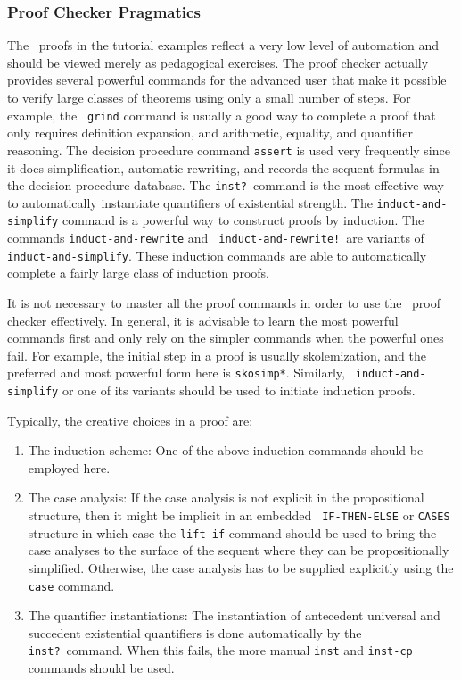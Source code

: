 \subsubsection{Proof Checker Pragmatics}

The \pvs\ proofs in the tutorial examples reflect a very low level of
automation and should be viewed merely as pedagogical exercises.  The
proof checker actually provides several powerful commands for the
advanced user that make it possible to verify large classes of
theorems using only a small number of steps.  For example, the {\tt
grind} command is usually a good way to complete a proof that only
requires definition expansion, and arithmetic, equality, and
quantifier reasoning.  The decision procedure command {\tt assert} is
used very frequently since it does simplification, automatic
rewriting, and records the sequent formulas in the decision procedure
database.  The {\tt inst?}\ command is the most effective way to
automatically instantiate quantifiers of existential strength.  The
{\tt induct-and-simplify} command is a powerful way to construct
proofs by induction.  The commands {\tt induct-and-rewrite} and {\tt
induct-and-rewrite!}\ are variants of {\tt induct-and-simplify}\@.
These induction commands are able to automatically complete a fairly
large class of induction proofs.

It is not necessary to master all the proof commands in order to use
the \pvs\ proof checker effectively.  In general, it is advisable to
learn the most powerful commands first and only rely on the simpler
commands when the powerful ones fail.  For example, the initial step
in a proof is usually skolemization, and the preferred and most
powerful form here is {\tt skosimp*}. Similarly, {\tt
induct-and-simplify} or one of its variants should be used to initiate
induction proofs.

 Typically, the creative choices in a proof are:
 \begin{enumerate}
 \item The induction scheme: One of the above induction commands should be
 employed here.

 \item The case analysis: If the case analysis is not explicit in the
 propositional structure, then it might be implicit in an embedded {\tt
 IF-THEN-ELSE} or {\tt CASES} structure in which case the {\tt lift-if}
 command should be used to bring the case analyses to the surface of the
 sequent where they can be propositionally simplified.  Otherwise, the case
 analysis has to be supplied explicitly using the {\tt case} command.

\item The quantifier instantiations:  The instantiation of antecedent
universal and succedent existential quantifiers is done automatically by
the {\tt inst?}\ command.  When this fails, the more manual {\tt inst} and
{\tt inst-cp} commands should be used.
\end{enumerate}

